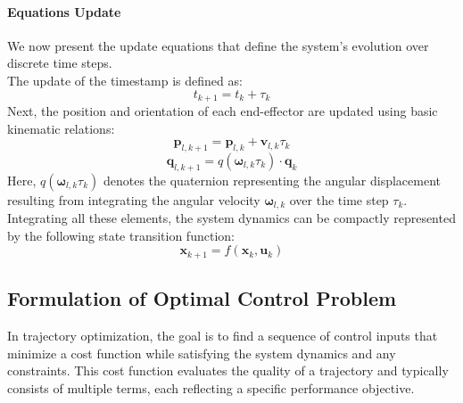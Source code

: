 \documentclass[main.tex]{subfiles}
\begin{document}
\begin{sloppypar}
\paragraph{Equations Update}We now present the update equations that define the system's evolution over discrete time steps. \\ 
The update of the timestamp is defined as:
\begin{equation}
    t_{k+1} = t_k + \tau_k
\end{equation}
Next, the position and orientation of each end-effector are updated using basic kinematic relations:
\begin{equation}
    \mathbf{p}_{l,k+1} = \mathbf{p}_{l,k} + \mathbf{v}_{l,k} \tau_k
\end{equation}
\begin{equation}
    \mathbf{q}_{l,k+1} = \textit{q}(\boldsymbol{\omega}_{l,k} \tau_k) \cdot \mathbf{q}_{k}
\end{equation}
Here, $\textit{q}(\boldsymbol{\omega}_{l,k} \tau_k)$ denotes the quaternion representing the angular displacement resulting from integrating the angular velocity $\boldsymbol{\omega}_{l,k}$ over the time step $\tau_k$.
Integrating all these elements, the system dynamics can be compactly represented by the following state transition function:
\begin{equation}
    \mathbf{x}_{k+1} = f(\mathbf{x}_k, \mathbf{u}_k)
\end{equation}
\subsection{Formulation of Optimal Control Problem}
In trajectory optimization, the goal is to find a sequence of control inputs that minimize a cost function while satisfying the system dynamics and any constraints. This cost function evaluates the quality of a trajectory and typically consists of multiple terms, each reflecting a specific performance objective.

\end{sloppypar}
\end{document}
